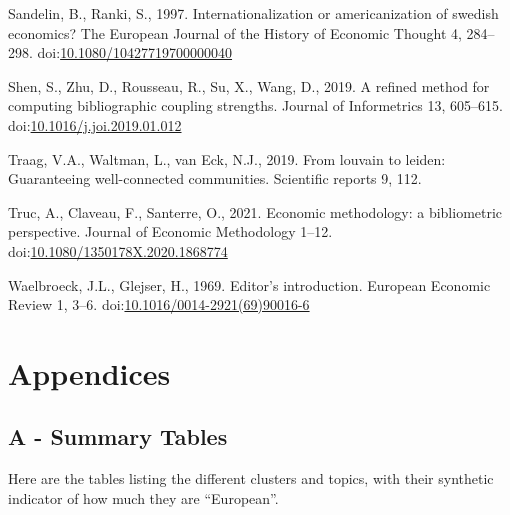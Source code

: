 \documentclass[]{elsarticle} %
\newlength{\cslhangindent}
\newlength{\cslentryspacingunit} %
\newenvironment{CSLReferences}[2] %
 {%
  \setlength{\parindent}{0pt}
  \ifodd #1
  \let\oldpar\par
  \def\par{\hangindent=\cslhangindent\oldpar}
  \fi
  \setlength{\parskip}{#2\cslentryspacingunit}
 }%
 {}
\begin{document}
\begin{CSLReferences}{1}{0}
\leavevmode{}%
Sandelin, B., Ranki, S., 1997. Internationalization or americanization
of swedish economics? The European Journal of the History of Economic
Thought 4, 284--298.
doi:\href{https://doi.org/10.1080/10427719700000040}{10.1080/10427719700000040}

\leavevmode{}%
Shen, S., Zhu, D., Rousseau, R., Su, X., Wang, D., 2019. A refined
method for computing bibliographic coupling strengths. Journal of
Informetrics 13, 605--615.
doi:\href{https://doi.org/10.1016/j.joi.2019.01.012}{10.1016/j.joi.2019.01.012}

\leavevmode{}%
Traag, V.A., Waltman, L., van Eck, N.J., 2019. From louvain to leiden:
Guaranteeing well-connected communities. Scientific reports 9, 112.

\leavevmode{}%
Truc, A., Claveau, F., Santerre, O., 2021. Economic methodology: a
bibliometric perspective. Journal of Economic Methodology 1--12.
doi:\href{https://doi.org/10.1080/1350178X.2020.1868774}{10.1080/1350178X.2020.1868774}

\leavevmode{}%
Waelbroeck, J.L., Glejser, H., 1969. Editor's introduction. European
Economic Review 1, 3--6.
doi:\href{https://doi.org/10.1016/0014-2921(69)90016-6}{10.1016/0014-2921(69)90016-6}

\end{CSLReferences}

\newpage

\hypertarget{appendices}{%
\section*{Appendices}\label{appendices}}

\hypertarget{a---summary-tables}{%
\subsection*{A - Summary Tables}\label{a---summary-tables}}

Here are the tables listing the different clusters and topics, with
their synthetic indicator of how much they are ``European''.
\end{document}
